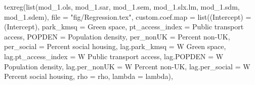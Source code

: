 \documentclass[
  letterpaper,
]{scrbook}
\newenvironment{Shaded}{\begin{snugshade}}{\end{snugshade}}
\newcommand{\AttributeTok}[1]{\textcolor[rgb]{0.40,0.45,0.13}{#1}}
\newcommand{\FunctionTok}[1]{\textcolor[rgb]{0.28,0.35,0.67}{#1}}
\newcommand{\NormalTok}[1]{\textcolor[rgb]{0.00,0.23,0.31}{#1}}
\newcommand{\OtherTok}[1]{\textcolor[rgb]{0.00,0.23,0.31}{#1}}
\newcommand{\StringTok}[1]{\textcolor[rgb]{0.13,0.47,0.30}{#1}}
\begin{document}
\begin{Shaded}
\begin{Highlighting}[]
\FunctionTok{texreg}\NormalTok{(}\FunctionTok{list}\NormalTok{(mod\_1.ols, mod\_1.sar, mod\_1.sem, mod\_1.slx.lm, mod\_1.sdm, mod\_1.sdem),}
        \AttributeTok{file =} \StringTok{"fig/Regression.tex"}\NormalTok{,}
          \AttributeTok{custom.coef.map =} \FunctionTok{list}\NormalTok{(}\StringTok{\textquotesingle{}(Intercept)\textquotesingle{}} \OtherTok{=}  \StringTok{\textquotesingle{}(Intercept)\textquotesingle{}}\NormalTok{,}
                                 \StringTok{\textquotesingle{}park\_kmsq\textquotesingle{}} \OtherTok{=}  \StringTok{\textquotesingle{}Green space\textquotesingle{}}\NormalTok{,}
                                 \StringTok{\textquotesingle{}pt\_access\_index\textquotesingle{}} \OtherTok{=}  \StringTok{\textquotesingle{}Public transport access\textquotesingle{}}\NormalTok{,}
                                 \StringTok{\textquotesingle{}POPDEN\textquotesingle{}} \OtherTok{=}  \StringTok{\textquotesingle{}Population density\textquotesingle{}}\NormalTok{,}
                                 \StringTok{\textquotesingle{}per\_nonUK\textquotesingle{}} \OtherTok{=}  \StringTok{\textquotesingle{}Percent non{-}UK\textquotesingle{}}\NormalTok{,}
                                 \StringTok{\textquotesingle{}per\_social\textquotesingle{}} \OtherTok{=} \StringTok{\textquotesingle{}Percent social housing\textquotesingle{}}\NormalTok{,}
                                 \StringTok{\textquotesingle{}lag.park\_kmsq\textquotesingle{}} \OtherTok{=}  \StringTok{\textquotesingle{}W Green space\textquotesingle{}}\NormalTok{,}
                                 \StringTok{\textquotesingle{}lag.pt\_access\_index\textquotesingle{}} \OtherTok{=}  \StringTok{\textquotesingle{}W Public transport access\textquotesingle{}}\NormalTok{,}
                                 \StringTok{\textquotesingle{}lag.POPDEN\textquotesingle{}} \OtherTok{=}  \StringTok{\textquotesingle{}W Population density\textquotesingle{}}\NormalTok{,}
                                 \StringTok{\textquotesingle{}lag.per\_nonUK\textquotesingle{}} \OtherTok{=}  \StringTok{\textquotesingle{}W Percent non{-}UK\textquotesingle{}}\NormalTok{,}
                                 \StringTok{\textquotesingle{}lag.per\_social\textquotesingle{}} \OtherTok{=} \StringTok{\textquotesingle{}W Percent social housing\textquotesingle{}}\NormalTok{,}
                                 \StringTok{\textquotesingle{}rho\textquotesingle{}} \OtherTok{=} \StringTok{\textquotesingle{}rho\textquotesingle{}}\NormalTok{,}
                                 \StringTok{\textquotesingle{}lambda\textquotesingle{}} \OtherTok{=} \StringTok{\textquotesingle{}lambda\textquotesingle{}}\NormalTok{),}

\end{Highlighting}
\end{Shaded}
\end{document}
